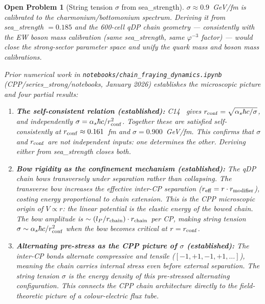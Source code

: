 \documentclass[11pt,a4paper]{article}
\newtheorem{openprob}[theorem]{Open Problem}
\newcommand{\lP}{l_P}
\newcommand{\phig}{\varphi}
\begin{document}
\begin{openprob}[String tension $\sigma$ from sea\_strength]
\label{op:sigma}
$\sigma \approx 0.9$~GeV/fm is calibrated to the charmonium/bottomonium
spectrum.  Deriving it from sea\_strength $= 0.185$ and the 600-cell
qDP chain geometry --- consistently with the EW boson mass
calibration (same sea\_strength, same $\phig^{-3}$ factor) ---
would close the strong-sector parameter space and unify the quark
mass and boson mass calibrations.

Prior numerical work in \texttt{notebooks/chain\_fraying\_dynamics.ipynb}
(CPP/series\_strong/notebooks, January 2026) establishes the microscopic
picture and four partial results:

\begin{enumerate}
\item \textbf{The self-consistent relation (established):}
  C14~\citep{c14} gives $r_{\rm conf} = \sqrt{\alpha_s \hbar c /
  \sigma}$, and independently $\sigma = \alpha_s \hbar c /
  r_{\rm conf}^2$.  Together these are satisfied self-consistently
  at $r_{\rm conf} \approx 0.161$~fm and $\sigma = 0.900$~GeV/fm.
  This confirms that $\sigma$ and $r_{\rm conf}$ are not independent
  inputs: one determines the other.  Deriving either from
  sea\_strength closes both.

\item \textbf{Bow rigidity as the confinement mechanism (established):}
  The qDP chain bows transversely under separation rather than
  collapsing.  The transverse bow increases the effective inter-CP
  separation ($r_{\rm eff} = r \cdot r_{\rm modifier}$), costing
  energy proportional to chain extension.  This is the CPP microscopic
  origin of $V \propto r$: the linear potential is the elastic energy
  of the bowed chain.  The bow amplitude is $\sim (\lP/r_{\rm chain})
  \cdot r_{\rm chain}$ per CP, making string tension
  $\sigma \sim \alpha_s \hbar c / r_{\rm conf}^2$ when the bow
  becomes critical at $r = r_{\rm conf}$.

\item \textbf{Alternating pre-stress as the CPP picture of $\sigma$
  (established):}
  The inter-CP bonds alternate compressive and tensile
  ($[-1,+1,-1,+1,\ldots]$), meaning the chain carries internal
  stress even before external separation.  The string tension
  $\sigma$ is the energy density of this pre-stressed alternating
  configuration.  This connects the CPP chain architecture directly
  to the field-theoretic picture of a colour-electric flux tube.


\end{enumerate}
\end{openprob}
\end{document}
